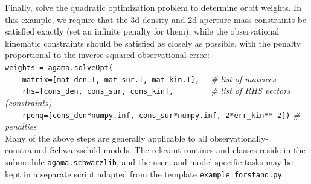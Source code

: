 \documentclass[12pt]{article}
\begin{document}
Finally, solve the quadratic optimization problem to determine orbit weights. In this example, we require that the 3d density and 2d aperture mass constraints be satisfied exactly (set an infinite penalty for them), while the observational kinematic constraints should be satisfied as closely as possible, with the penalty proportional to the inverse squared observational error:\\[2mm]
\texttt{weights = agama.solveOpt(\\
\mbox{}~~~~matrix=[mat_den.T, mat_sur.T, mat_kin.T],}
\textit{\color{Sepia} \ \ \# list of matrices}\\
\texttt{\mbox{}~~~~rhs=[cons_den, cons_sur, cons_kin],~~~~~~\mbox{}}
\textit{\color{Sepia} \ \ \# list of RHS vectors (constraints)}\\
\texttt{\mbox{}~~~~rpenq=[cons_den*numpy.inf, cons_sur*numpy.inf, 2*err_kin**-2])}
\textit{\color{Sepia}\# penalties}\\[3mm]
Many of the above steps are generally applicable to all observationally-constrained Schwarzschild models. The relevant routines and classes reside in the submodule \texttt{agama.schwarzlib}, and the user- and model-specific tasks may be kept in a separate script adapted from the template \texttt{example_forstand.py}.


\newpage
{}
\end{document}

